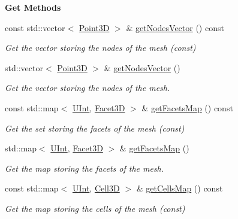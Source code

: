 \begin{Indent}{\bf Get Methods}\par
\begin{DoxyCompactItemize}
\item 
const std\+::vector$<$ \hyperlink{classFVCode3D_1_1Point3D}{Point3D} $>$ \& \hyperlink{classFVCode3D_1_1Mesh3D_a04162ec60e0fe52674b3ecbb7de1185c}{get\+Nodes\+Vector} () const 
\begin{DoxyCompactList}\small\item\em Get the vector storing the nodes of the mesh (const) \end{DoxyCompactList}\item 
std\+::vector$<$ \hyperlink{classFVCode3D_1_1Point3D}{Point3D} $>$ \& \hyperlink{classFVCode3D_1_1Mesh3D_a4462a272f3a143761989b786f1adb778}{get\+Nodes\+Vector} ()
\begin{DoxyCompactList}\small\item\em Get the vector storing the nodes of the mesh. \end{DoxyCompactList}\item 
const std\+::map$<$ \hyperlink{namespaceFVCode3D_a4bf7e328c75d0fd504050d040ebe9eda}{U\+Int}, \hyperlink{classFVCode3D_1_1Mesh3D_1_1Facet3D}{Facet3D} $>$ \& \hyperlink{classFVCode3D_1_1Mesh3D_a76de387da2a552e3e1210d795bc7acf9}{get\+Facets\+Map} () const 
\begin{DoxyCompactList}\small\item\em Get the set storing the facets of the mesh (const) \end{DoxyCompactList}\item 
std\+::map$<$ \hyperlink{namespaceFVCode3D_a4bf7e328c75d0fd504050d040ebe9eda}{U\+Int}, \hyperlink{classFVCode3D_1_1Mesh3D_1_1Facet3D}{Facet3D} $>$ \& \hyperlink{classFVCode3D_1_1Mesh3D_aee76d9e8ce9fd31bdcab54d99ce991a7}{get\+Facets\+Map} ()
\begin{DoxyCompactList}\small\item\em Get the map storing the facets of the mesh. \end{DoxyCompactList}\item 
const std\+::map$<$ \hyperlink{namespaceFVCode3D_a4bf7e328c75d0fd504050d040ebe9eda}{U\+Int}, \hyperlink{classFVCode3D_1_1Mesh3D_1_1Cell3D}{Cell3D} $>$ \& \hyperlink{classFVCode3D_1_1Mesh3D_ad904ef5e068c89951d77e9364e960bf3}{get\+Cells\+Map} () const 
\begin{DoxyCompactList}\small\item\em Get the map storing the cells of the mesh (const) \end{DoxyCompactList}\item 

\end{DoxyCompactItemize}
\end{Indent}
